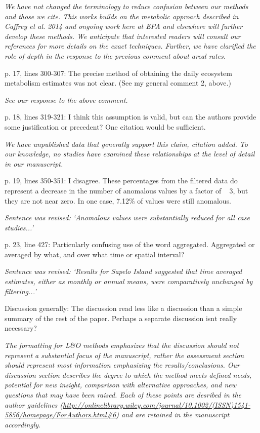 \documentclass[letterpaper,12pt]{article}\usepackage[]{graphicx}\usepackage[]{color}
\begin{document}
{\it We have not changed the terminology to reduce confusion between our methods and those we cite.  This works builds on the metabolic approach described in Caffrey et al. 2014 and ongoing work here at EPA and elsewhere will further develop these methods.  We anticipate that interested readers will consult our references for more details on the exact techniques.  Further, we have clarified the role of depth in the response to the previous comment about areal rates.}

p. 17, lines 300-307: The precise method of obtaining the daily ecosystem metabolism estimates was not clear. (See my general comment 2, above.)

{\it See our response to the above comment.}

p. 18, lines 319-321: I think this assumption is valid, but can the authors provide some justification or precedent? One citation would be sufficient.

{\it We have unpublished data that generally support this claim, citation added.  To our knowledge, no studies have examined these relationships at the level of detail in our manuscript.}

p. 19, lines 350-351: I disagree. These percentages from the filtered data do represent a decrease
in the number of anomalous values by a factor of ~ 3, but they are not near zero. In one case,
7.12\% of values were still anomalous.

{\it Sentence was revised: `Anomalous values were substantially reduced for all case studies...'}

p. 23, line 427: Particularly confusing use of the word aggregated. Aggregated or averaged by
what, and over what time or spatial interval?

{\it Sentence was revised: `Results for Sapelo Island suggested that time averaged estimates, either as monthly or annual means, were comparatively unchanged by filtering...'}

Discussion generally: The discussion read less like a discussion than a simple summary of the rest of the paper. Perhaps a separate discussion isnt really necessary?

{\it The formatting for L\&O methods emphasizes that the discussion should not represent a substantial focus of the manuscript, rather the assessment section should represent most information emphasizing the results/conclusions.  Our discussion section describes the degree to which the method meets defined needs, potential for new insight, comparison with alternative approaches, and new questions that may have been raised.  Each of these points are desribed in the author guidelines (\href{http://onlinelibrary.wiley.com/journal/10.1002/(ISSN)1541-5856/homepage/ForAuthors.html#6}{http://onlinelibrary.wiley.com/journal/10.1002/(ISSN)1541-5856/homepage/ForAuthors.html\#6}) and are retained in the manuscript accordingly. 
}
\end{document}
